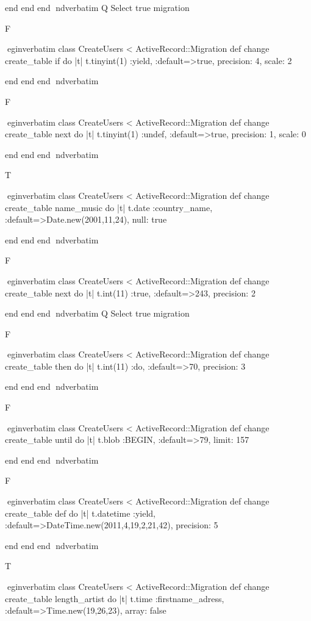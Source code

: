     end 
  end 
end
nd{verbatim}
Q
 Select true migration

F

egin{verbatim}
 class CreateUsers < ActiveRecord::Migration 
  def change 
    create_table if do |t| 
      t.tinyint(1) :yield, :default=>true, precision: 4, scale: 2
    
    end 
  end 
end
nd{verbatim}

F

egin{verbatim}
 class CreateUsers < ActiveRecord::Migration 
  def change 
    create_table next do |t| 
      t.tinyint(1) :undef, :default=>true, precision: 1, scale: 0
    
    end 
  end 
end
nd{verbatim}

T

egin{verbatim}
 class CreateUsers < ActiveRecord::Migration 
  def change 
    create_table name_music do |t| 
      t.date :country_name, :default=>Date.new(2001,11,24), null: true
    
    end 
  end 
end
nd{verbatim}

F

egin{verbatim}
 class CreateUsers < ActiveRecord::Migration 
  def change 
    create_table next do |t| 
      t.int(11) :true, :default=>243, precision: 2
    
    end 
  end 
end
nd{verbatim}
Q
 Select true migration

F

egin{verbatim}
 class CreateUsers < ActiveRecord::Migration 
  def change 
    create_table then do |t| 
      t.int(11) :do, :default=>70, precision: 3
    
    end 
  end 
end
nd{verbatim}

F

egin{verbatim}
 class CreateUsers < ActiveRecord::Migration 
  def change 
    create_table until do |t| 
      t.blob :BEGIN, :default=>79, limit: 157
    
    end 
  end 
end
nd{verbatim}

F

egin{verbatim}
 class CreateUsers < ActiveRecord::Migration 
  def change 
    create_table def do |t| 
      t.datetime :yield, :default=>DateTime.new(2011,4,19,2,21,42), precision: 5
    
    end 
  end 
end
nd{verbatim}

T

egin{verbatim}
 class CreateUsers < ActiveRecord::Migration 
  def change 
    create_table length_artist do |t| 
      t.time :firstname_adress, :default=>Time.new(19,26,23), array: false
    
